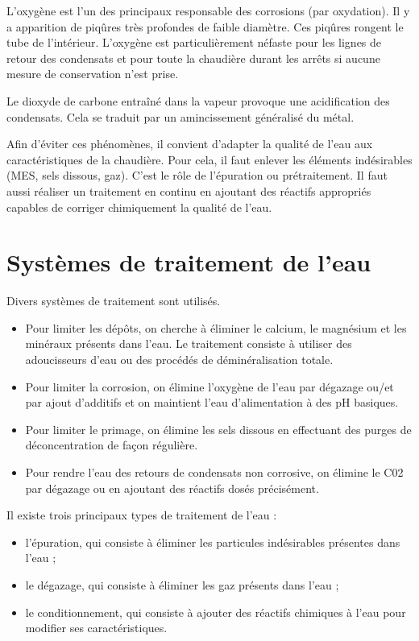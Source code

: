 L’oxygène est l’un des principaux responsable des corrosions (par oxydation). Il y a apparition de piqûres très profondes de faible diamètre. Ces piqûres rongent le tube de l’intérieur.
L’oxygène est particulièrement néfaste pour les lignes de retour des condensats et pour toute la chaudière durant les arrêts si aucune mesure de conservation n’est prise.
\vspace{0.3cm}

Le dioxyde de carbone entraîné dans la vapeur provoque une acidification des condensats. Cela se traduit par un amincissement généralisé du métal.
\vspace{0.3cm}

Afin d’éviter ces phénomènes, il convient d’adapter la qualité de l’eau aux caractéristiques de la chaudière. Pour cela, il faut enlever les éléments indésirables (MES, sels dissous, gaz). C’est le rôle de l’épuration ou prétraitement. Il faut aussi réaliser un traitement en continu en ajoutant des réactifs appropriés capables de corriger chimiquement la qualité de l’eau.






\section{	Systèmes de traitement de l'eau}



Divers systèmes de traitement sont utilisés.
\begin{itemize}
\item  Pour limiter les dépôts, on cherche à éliminer le calcium, le magnésium et les minéraux présents dans l’eau. Le traitement consiste à utiliser des adoucisseurs d’eau ou des procédés de déminéralisation totale.
\item  Pour limiter la corrosion, on élimine l’oxygène de l’eau par dégazage ou/et par ajout d’additifs et on maintient l’eau d’alimentation à des pH basiques.
\item  Pour limiter le primage, on élimine les sels dissous en effectuant des purges de déconcentration de façon régulière.
\item  Pour rendre l’eau des retours de condensats non corrosive, on élimine le C02 par dégazage ou en ajoutant des réactifs dosés précisément.
\end{itemize}

Il existe trois principaux types de traitement de l'eau :

 \begin{itemize}
\item  l’épuration, qui consiste à éliminer les particules indésirables présentes dans l’eau ;
\item  le dégazage, qui consiste à éliminer les gaz présents dans l’eau ;
\item  le conditionnement, qui consiste à ajouter des réactifs chimiques à l’eau pour modifier ses caractéristiques.

\end{itemize} 

